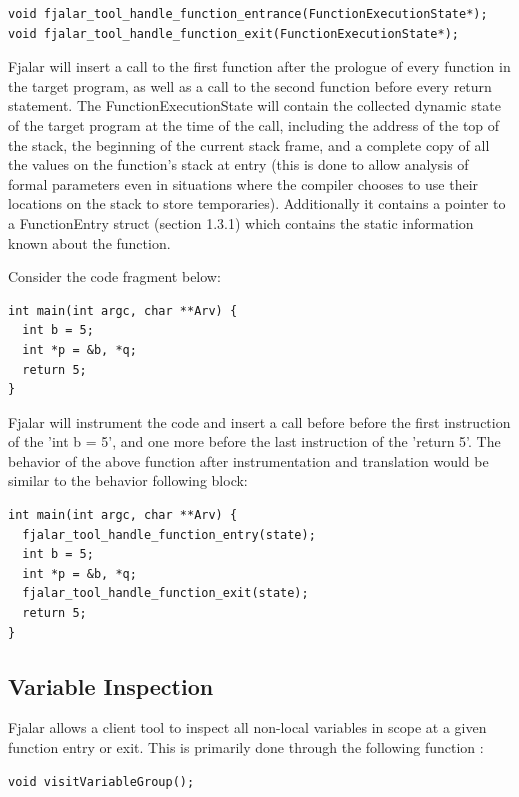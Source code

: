 \documentclass[11pt]{article}
\begin{document}
\lstset{language=C, frame=none, basicstyle=\small}
\begin{lstlisting}
void fjalar_tool_handle_function_entrance(FunctionExecutionState*);
void fjalar_tool_handle_function_exit(FunctionExecutionState*);
\end{lstlisting}

Fjalar will insert a call to the first function after the
prologue of every function in the target program, as well as a
call to the second function before every return statement. The
FunctionExecutionState will contain the collected dynamic state of the
target program at the time of the call, including the address of the top of the stack, the
beginning of the current stack frame, and a complete copy of all the
values on the function's stack at entry (this is done to allow
analysis of formal parameters even in situations where the compiler
chooses to use their locations on the stack to store temporaries). 
Additionally it contains a pointer to a FunctionEntry struct (section
1.3.1) which contains the static information known about the function.

Consider the code fragment below:

\lstset{language=C, frame=single,basicstyle=\small}
\begin{lstlisting}
int main(int argc, char **Arv) {
  int b = 5;
  int *p = &b, *q;
  return 5;
}
\end{lstlisting}

Fjalar will instrument the code and insert a call before before the
first instruction of the 'int b = 5', and one more before the last
instruction of the 'return 5'. The behavior of the above function
after instrumentation and translation would be similar to the
behavior following block: 

\begin{lstlisting}
int main(int argc, char **Arv) {
  fjalar_tool_handle_function_entry(state);
  int b = 5;
  int *p = &b, *q;
  fjalar_tool_handle_function_exit(state);
  return 5;
}
\end{lstlisting}


\subsection{Variable Inspection}

Fjalar allows a client tool to inspect all non-local  variables in
scope at a given function entry or exit. This is primarily done
through the following function :

\lstset{language=C, frame=none, basicstyle=\small}
\begin{lstlisting}
void visitVariableGroup();
\end{lstlisting}
\end{document}
